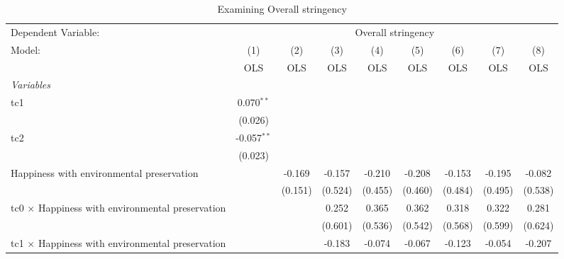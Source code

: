 
\begin{table}[htbp]
   \caption{Examining Overall stringency}
   \centering
   \begin{tabular}{lcccccccc}
      \toprule
      Dependent Variable: & \multicolumn{8}{c}{Overall stringency}\\
      Model:                                                  & (1)           & (2)     & (3)     & (4)          & (5)          & (6)          & (7)          & (8)\\  
                                                              &  OLS          & OLS     & OLS     & OLS          & OLS          & OLS          & OLS          & OLS\\  
      \midrule
      \emph{Variables}\\
      tc1                                                     & 0.070$^{**}$  &         &         &              &              &              &              &   \\   
                                                              & (0.026)       &         &         &              &              &              &              &   \\   
      tc2                                                     & -0.057$^{**}$ &         &         &              &              &              &              &   \\   
                                                              & (0.023)       &         &         &              &              &              &              &   \\   
      Happiness with environmental preservation               &               & -0.169  & -0.157  & -0.210       & -0.208       & -0.153       & -0.195       & -0.082\\   
                                                              &               & (0.151) & (0.524) & (0.455)      & (0.460)      & (0.484)      & (0.495)      & (0.538)\\   
      tc0 $\times$ Happiness with environmental preservation  &               &         & 0.252   & 0.365        & 0.362        & 0.318        & 0.322        & 0.281\\   
                                                              &               &         & (0.601) & (0.536)      & (0.542)      & (0.568)      & (0.599)      & (0.624)\\   
      tc1 $\times$ Happiness with environmental preservation  &               &         & -0.183  & -0.074       & -0.067       & -0.123       & -0.054       & -0.207\\   

\end{tabular}
\end{table}
